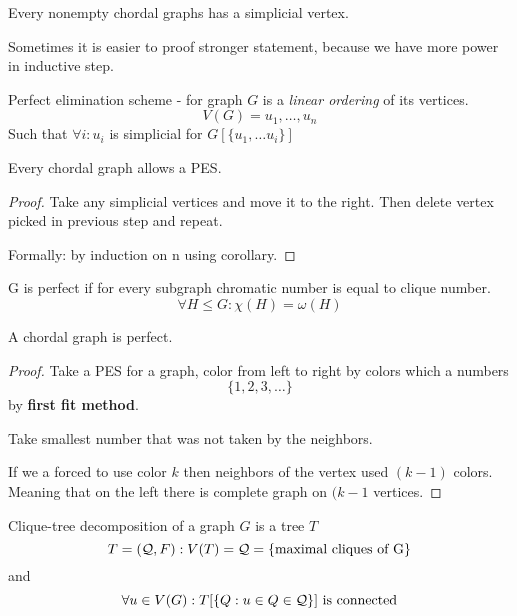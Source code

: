 \begin{corollary}
	Every nonempty chordal graphs has a simplicial vertex.
\end{corollary}

Sometimes it is easier to proof stronger statement, because we have more power in inductive step.

\begin{definition}[PES]
	Perfect elimination scheme - for graph $G$ is a \emph{linear ordering} of its vertices.
	\[ V(G) = u_1, \ldots, u_n\]
	Such that $\forall i: u_i$ is simplicial for $G[\{ u_1, \ldots u_i\}]$
\end{definition}

\begin{note}
	Every chordal graph allows a PES.
\end{note}
\begin{proof}
	Take any simplicial vertices and move it to the right.
	Then delete vertex picked in previous step and repeat.

	Formally: by induction on n using corollary.
\end{proof}

\begin{definition}
	G is perfect if for every subgraph chromatic number is equal to clique number.
	\[ \forall H \leq G: \chi(H) = \omega(H) \]
\end{definition}

\begin{theorem}
	A chordal graph is perfect.
\end{theorem}
\begin{proof}
	Take a PES for a graph, color from left to right by colors which a numbers
	\[ \{ 1, 2, 3, \ldots \} \]
	by \textbf{first fit method}.

	Take smallest number that was not taken by the neighbors.

	If we a forced to use color $k$ then neighbors of the vertex used $(k - 1)$ colors.
	Meaning that on the left there is complete graph on $(k - 1$ vertices.
\end{proof}

\begin{definition}
	Clique-tree decomposition of a graph $G$ is a tree $T$
	\[ T = (\operatorname{\mathcal{Q}}, F): V(T) = \operatorname{\mathcal{Q}} = \{\text{maximal cliques of G} \} \]
	and
	\[ \forall u \in V(G): T[ \{Q: u \in Q \in \operatorname{\mathcal{Q}} \}] \text{ is connected} \]
\end{definition}

